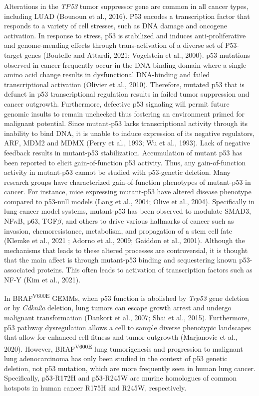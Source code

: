 Alterations in the \emph{TP53} tumor suppressor gene are common in all cancer types, including LUAD (Bouaoun et al., 2016). P53 encodes a transcription factor that responds to a variety of cell stresses, such as DNA damage and oncogene activation. In response to stress, p53 is stabilized and induces anti-proliferative and genome-mending effects through trans-activation of a diverse set of P53-target genes (Boutelle and Attardi, 2021; Vogelstein et al., 2000). p53 mutations observed in cancer frequently occur in the DNA binding domain where a single amino acid change results in dysfunctional DNA-binding and failed transcriptional activation (Olivier et al., 2010). Therefore, mutated p53 that is defunct in p53 transcriptional regulation results in failed tumor suppression and cancer outgrowth. Furthermore, defective p53 signaling will permit future genomic insults to remain unchecked thus fostering an environment primed for malignant potential. Since mutant-p53 lacks transcriptional activity through its inability to bind DNA, it is unable to induce expression of its negative regulators, ARF, MDM2 and MDMX (Perry et al., 1993; Wu et al., 1993). Lack of negative feedback results in mutant-p53 stabilization. Accumulation of mutant p53 has been reported to elicit gain-of-function p53 activity. Thus, any gain-of-function activity in mutant-p53 cannot be studied with p53-genetic deletion. Many research groups have characterized gain-of-function phenotypes of mutant-p53 in cancer. For instance, mice expressing mutant-p53 have altered disease phenotype compared to p53-null models (Lang et al., 2004; Olive et al., 2004). Specifically in lung cancer model systems, mutant-p53 has been observed to modulate SMAD3, NF\(\kappa\)B, p63, TGF\(\beta\), and others to drive various hallmarks of cancer such as invasion, chemoresistance, metabolism, and propagation of a stem cell fate (Klemke et al., 2021 ; Adorno et al., 2009; Gaiddon et al., 2001). Although the mechanisms that leads to these altered processes are controversial, it is thought that the main affect is through mutant-p53 binding and sequestering known p53-associated proteins. This often leads to activation of transcription factors such as NF-Y (Kim et al., 2021).

In BRAF\textsuperscript{V600E} GEMMs, when p53 function is abolished by \emph{Trp53} gene deletion or by \emph{Cdkn2a} deletion, lung tumors can escape growth arrest and undergo malignant transformation (Dankort et al., 2007; Shai et al., 2015). Furthermore, p53 pathway dysregulation allows a cell to sample diverse phenotypic landscapes that allow for enhanced cell fitness and tumor outgrowth (Marjanovic et al., 2020). However, BRAF\textsuperscript{V600E} lung tumorigenesis and progression to malignant lung adenocarcinoma has only been studied in the context of p53 genetic deletion, not p53 mutation, which are more frequently seen in human lung cancer. Specifically, p53-R172H and p53-R245W are murine homologues of common hotspots in human cancer R175H and R245W, respectively.

